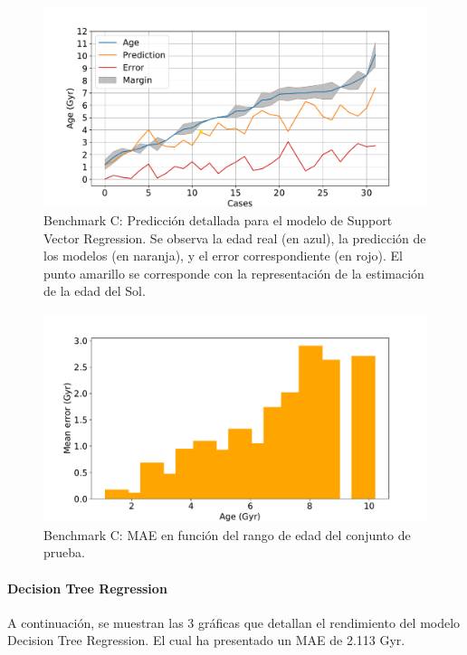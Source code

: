 \begin{figure}[H]
\begin{center}
 \includegraphics[width=0.8\linewidth]{Figuras/Experimentos/B_C_svm_2.pdf}
\end{center}
\caption{Benchmark C: Predicción detallada para el modelo de Support Vector Regression. Se observa la edad real (en azul), la predicción de los modelos (en naranja), y el error correspondiente (en rojo). El punto amarillo se corresponde con la representación de la estimación de la edad del Sol.}
 \label{fig:benchC_details_svm_2}
\end{figure}

\begin{figure}[H]
\begin{center}
 \includegraphics[width=0.8\linewidth]{Figuras/Experimentos/B_C_svm_3.pdf}
\end{center}
\caption{Benchmark C: MAE en función del rango de edad del conjunto de prueba.}
 \label{fig:benchC_details_svm_3}
\end{figure}

\paragraph{Decision Tree Regression} 
A continuación, se muestran las 3 gráficas que detallan el rendimiento del modelo Decision Tree Regression. El cual ha presentado un MAE de 2.113 Gyr.

